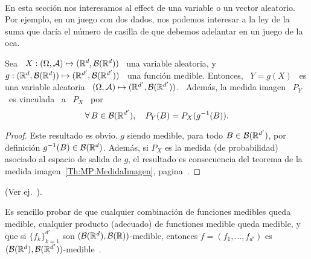 \




\label{Ssec:MP:Transformacion}

En  esta  secci\'on nos  interesamos  al  effect de  una  variable  o un  vector
aleatorio. Por  ejemplo, en un juego con  dos dados, nos podemos  interesar a la
ley de la suma que dar\'ia el n\'umero de casilla de que debemos adelantar en un
juego de la oca.
%
\begin{teorema}
  Sea  \  $X:  (\Omega,\mathcal{A})  \mapsto  (\mathbb{R}^d ,  \mathcal{B}(\mathbb{R}^d))$  \  una  variable
  aleatoria,   y  \   $g:  (\mathbb{R}^d   ,  \mathcal{B}(\mathbb{R}^d))   \mapsto   (\mathbb{R}^{d'}  ,
  \mathcal{B}(\mathbb{R}^{d'}))$ \  una funci\'on  medible. Entonces,  \ $Y =  g(X)$ \  es una
  variable aleatoria  \ $(\Omega,\mathcal{A})  \mapsto (\mathbb{R}^{d'} ,  \mathcal{B}(\mathbb{R}^{d'}))$. \
  Adem\'as, la medida imagen \ $P_Y$ \ es vinculada \ a \ $P_X$ \ por
  \[
  \forall \, B \in \mathcal{B}(\mathbb{R}^{d'}), \quad P_Y(B) = P_X(g^{-1}(B)).
  \]
\end{teorema}
%
\begin{proof}
  Este resultado es obvio. $g$ siendo medible, para todo $B \in \mathcal{B}(\mathbb{R}^{d'})$,
  por definici\'on $g^{-1}(B) \in \mathcal{B}(\mathbb{R}^d)$.  Adem\'as, si $P_X$ es la medida
  (de  probabilidad) asociado  al  espacio de  salida  de $g$,  el resultado  es
  consecuencia  del   teorema  de  la   medida  imagen~\ref{Th:MP:MedidaImagen},
  pagina~\pageref{Th:MP:MedidaImagen}.
\end{proof}
%
\noindent (Ver ej.~\cite{JacPro03, AthLah06, Bog07:v2, Coh13}).


Es sencillo  probar de que  cualquier combinaci\'on de funciones  medibles queda
medible, cualquier  producto (adecuado) de  functiones medible queda  medible, y
que si $\{ f_k \}_{k=1}^{d'}$ son $(\mathcal{B}(\mathbb{R}^d),\mathcal{B}(\mathbb{R}))$-medible, entonces $f
=          (f_1         ,          \ldots         ,          f_{d'})$         es
$(\mathcal{B}(\mathbb{R}^d),\mathcal{B}(\mathbb{R}^{d'}))$-medible~\cite{AthLah06}.



